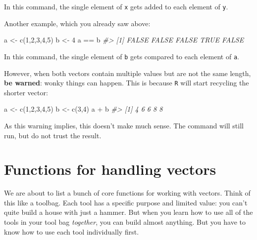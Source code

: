 \documentclass[
]{book}
\newenvironment{Shaded}{\begin{snugshade}}{\end{snugshade}}
\newcommand{\CommentTok}[1]{\textcolor[rgb]{0.56,0.35,0.01}{\textit{#1}}}
\newcommand{\DecValTok}[1]{\textcolor[rgb]{0.00,0.00,0.81}{#1}}
\newcommand{\FunctionTok}[1]{\textcolor[rgb]{0.00,0.00,0.00}{#1}}
\newcommand{\NormalTok}[1]{#1}
\newcommand{\OtherTok}[1]{\textcolor[rgb]{0.56,0.35,0.01}{#1}}
\newcommand{\SpecialCharTok}[1]{\textcolor[rgb]{0.00,0.00,0.00}{#1}}
\begin{document}
In this command, the single element of \texttt{x} gets added to each element of \texttt{y}.

Another example, which you already saw above:

\begin{Shaded}
\begin{Highlighting}[]
\NormalTok{a }\OtherTok{\textless{}{-}} \FunctionTok{c}\NormalTok{(}\DecValTok{1}\NormalTok{,}\DecValTok{2}\NormalTok{,}\DecValTok{3}\NormalTok{,}\DecValTok{4}\NormalTok{,}\DecValTok{5}\NormalTok{)}
\NormalTok{b }\OtherTok{\textless{}{-}} \DecValTok{4}
\NormalTok{a }\SpecialCharTok{==}\NormalTok{ b}
\CommentTok{\#\textgreater{} [1] FALSE FALSE FALSE  TRUE FALSE}
\end{Highlighting}
\end{Shaded}

In this command, the single element of \texttt{b} gets compared to each element of \texttt{a}.

However, when both vectors contain multiple values but are not the same length, \textbf{be warned}: wonky things can happen. This is because \texttt{R} will start recycling the shorter vector:

\begin{Shaded}
\begin{Highlighting}[]
\NormalTok{a }\OtherTok{\textless{}{-}} \FunctionTok{c}\NormalTok{(}\DecValTok{1}\NormalTok{,}\DecValTok{2}\NormalTok{,}\DecValTok{3}\NormalTok{,}\DecValTok{4}\NormalTok{,}\DecValTok{5}\NormalTok{)}
\NormalTok{b }\OtherTok{\textless{}{-}} \FunctionTok{c}\NormalTok{(}\DecValTok{3}\NormalTok{,}\DecValTok{4}\NormalTok{)}
\NormalTok{a }\SpecialCharTok{+}\NormalTok{ b}
\CommentTok{\#\textgreater{} [1] 4 6 6 8 8}
\end{Highlighting}
\end{Shaded}

As this warning implies, this doesn't make much sense. The command will still run, but do not trust the result.

\hypertarget{functions-for-handling-vectors}{%
\section*{Functions for handling vectors}\label{functions-for-handling-vectors}}

We are about to list a bunch of core functions for working with vectors. Think of this like a toolbag. Each tool has a specific purpose and limited value: you can't quite build a house with just a hammer. But when you learn how to use all of the tools in your tool bag \emph{together}, you can build almost anything. But you have to know how to use each tool individually first.
\end{document}
